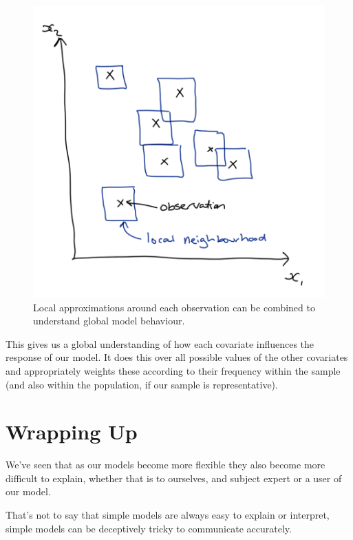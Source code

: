 \documentclass[
  12pt,
]{book}
\begin{document}
\begin{figure}

{\centering \includegraphics[width=12.5in]{images/402-production-explainability/local-neighbourhoods} 

}

\caption{Local approximations around each observation can be combined to understand global model behaviour.}\label{fig:unnamed-chunk-11}
\end{figure}

This gives us a global understanding of how each covariate influences the response of our model. It does this over all possible values of the other covariates and appropriately weights these according to their frequency within the sample (and also within the population, if our sample is representative).

\hypertarget{wrapping-up-6}{%
\section{Wrapping Up}\label{wrapping-up-6}}

We've seen that as our models become more flexible they also become more difficult to explain, whether that is to ourselves, and subject expert or a user of our model.

That's not to say that simple models are always easy to explain or interpret, simple models can be deceptively tricky to communicate accurately.
\end{document}
